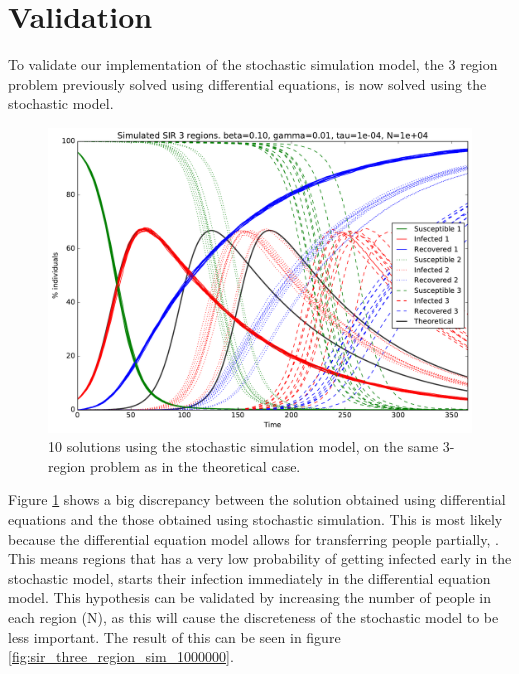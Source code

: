 \section{Validation}

To validate our implementation of the stochastic simulation model, the 3 region problem previously solved using differential equations, is now solved using the stochastic model.

\begin{figure}[H]
	\centering
	\includegraphics[width= 1.0 \linewidth]{plots/sir_three_region_sim_10000.pdf}
	\caption{10 solutions using the stochastic simulation model, on the same 3-region problem as in the theoretical case.}
	\label{fig:sir_three_region_sim_10000}
\end{figure}

Figure \ref{fig:sir_three_region_sim_10000} shows a big discrepancy between the solution obtained using differential equations and the those obtained using stochastic simulation. This is most likely because the differential equation model allows for transferring people partially, . This means regions that has a very low probability of getting infected early in the stochastic model, starts their infection immediately in the differential equation model. This hypothesis can be validated by increasing the number of people in each region (N), as this will cause the discreteness of the stochastic model to be less important. The result of this can be seen in figure \ref{fig:sir_three_region_sim_1000000}. 

